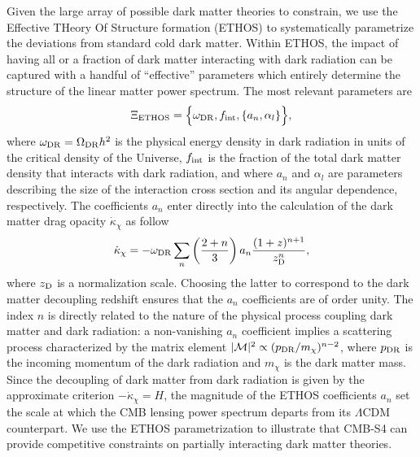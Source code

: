 Given the large array of possible dark matter theories to constrain, we use the Effective THeory Of Structure formation (ETHOS) \cite{Cyr-Racine:2015ihg} to systematically parametrize the deviations from standard cold dark matter. Within ETHOS, the impact of having all or a fraction of dark matter interacting with dark radiation can be captured with a handful of ``effective'' parameters which entirely determine the structure of the linear matter power spectrum. The most relevant parameters are \cite{Cyr-Racine:2015ihg}
%
\begin{equation}
\Xi_{\rm ETHOS} = \Big\{\omega_{\rm DR},f_{\rm int}, \{a_n,\alpha_l\} \Big\},
\end{equation}
%
where $\omega_{\rm DR} = \Omega_{\rm DR}h^2$ is the physical energy density in dark radiation in units of the critical density of the Universe, $f_{\rm int}$ is the fraction of the total dark matter density that interacts with dark radiation, and where $a_n$ and $\alpha_l$ are parameters describing the size of the interaction cross section and its angular dependence, respectively. The coefficients $a_n$ enter directly into the calculation of the dark matter drag opacity $\dot{\kappa}_\chi$ as follow
%
\begin{equation}
\dot{\kappa}_\chi =- \omega_{\rm DR} \sum_n \left(\frac{2+n}{3}\right)a_n \frac{(1+z)^{n+1}}{z_{\rm D}^n},
\end{equation}
%
where $z_{\rm D}$ is a normalization scale. Choosing the latter to correspond to the dark matter decoupling redshift ensures that the $a_n$ coefficients are of order unity. The index $n$ is directly related to the nature of the physical process coupling dark matter and dark radiation: a non-vanishing $a_n$ coefficient implies a scattering process characterized by the matrix element $|\mathcal{M}|^2 \propto (p_{\rm DR}/m_\chi)^{n-2}$, where $p_{\rm DR}$ is the incoming momentum of the dark radiation and $m_\chi$ is the dark matter mass. Since the decoupling of dark matter from dark radiation is given by the approximate criterion $-\dot{\kappa}_\chi = H$, the magnitude of the ETHOS coefficients $a_n$ set the scale at which the CMB lensing power spectrum departs from its $\Lambda$CDM counterpart.  We use the ETHOS parametrization to illustrate that CMB-S4 can provide competitive constraints on partially interacting dark matter theories.

